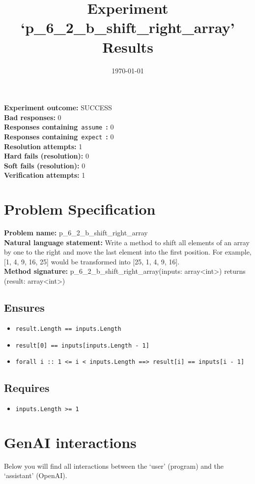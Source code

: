 \documentclass{article}
\begin{document}
\title{Experiment `p\_6\_2\_b\_shift\_right\_array' Results}
\author{\today}
\date{}
\maketitle
\textbf{Experiment outcome: }SUCCESS
\\\textbf{Bad responses: }0
\\\textbf{Responses containing}~\texttt{assume}~\textbf{: }0
\\\textbf{Responses containing}~\texttt{expect}~\textbf{: }0
\\\textbf{Resolution attempts: }1
\\\textbf{Hard fails (resolution): }0
\\\textbf{Soft fails (resolution): }0
\\\textbf{Verification attempts: }1
\section*{Problem Specification}
\textbf{Problem name: }p\_6\_2\_b\_shift\_right\_array
\\\textbf{Natural language statement: }Write a method to shift all elements of an array by one to the right and move the last element into the first position. For example, [1, 4, 9, 16, 25] would be transformed into [25, 1, 4, 9, 16].
\\\textbf{Method signature: }p\_6\_2\_b\_shift\_right\_array(inputs: array<int>) returns (result: array<int>)
\subsection*{Ensures}
\begin{itemize}
\item \texttt{result.Length == inputs.Length}
\item \texttt{result[0] == inputs[inputs.Length - 1]}
\item \texttt{forall i :: 1 <= i < inputs.Length ==> result[i] == inputs[i - 1]}
\end{itemize}
\subsection*{Requires}
\begin{itemize}
\item \texttt{inputs.Length >= 1}
\end{itemize}
\clearpage
\section*{GenAI interactions}
Below you will find all interactions between the `user' (program) and the `assistant' (OpenAI).
\end{document}
